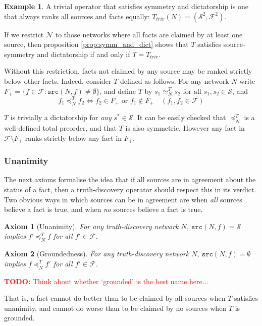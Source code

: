 \documentclass{article}
\theoremstyle{definition} \newtheorem{definition}{Definition}
\theoremstyle{definition} \newtheorem{example}{Example}
\theoremstyle{plain} \newtheorem{axiom}{Axiom}
\theoremstyle{plain} \newtheorem*{remark}{Remark}
\theoremstyle{remark} \newtheorem*{notation}{Notation}
\theoremstyle{plain} \newtheorem{lemma}{Lemma}
\theoremstyle{plain} \newtheorem{theorem}{Theorem}
\theoremstyle{plain} \newtheorem{proposition}{Proposition}
\newcommand{\todo}[1] {
    \textcolor{red}{
        \textbf{TODO:} #1
    }
}
\renewcommand{\S}{\mathcal{S}}  %
\newcommand{\F}{\mathcal{F}}
\newcommand{\N}{\mathcal{N}}
\newcommand{\seq}{\simeq}
\newcommand{\fle}{\preceq}
\newcommand{\src}{\texttt{src}}
\begin{document}
\begin{example}
A trivial operator that satisfies symmetry and dictatorship is one that always
ranks all sources and facts equally: $T_{triv}(N) = (\S^2, \F^2)$.

If we restrict $\N$ to those networks where all facts are claimed by
at least one source, then proposition \ref{prop:symm_and_dict} shows that $T$
satisfies source-symmetry and dictatorship if and only if $T=T_{triv}$.

Without this restriction, facts not claimed by any source may be ranked
strictly below other facts. Indeed, consider $T$ defined as follows. For any
network $N$ write $F_{+} = \{f \in \F : \src(N, f) \ne \emptyset \}$, and
define $T$ by $s_1 \seq_N^{T} s_2 \text{ for all } s_1, s_2 \in \S$, and
$$
    f_1 \fle_N^{T} f_2 \iff f_2 \in F_{+} \text{ or } f_1 \notin F_{+}
    \quad
    (f_1, f_2 \in \F)
$$

$T$ is trivially a dictatorship for \emph{any} $s^* \in \S$. It can be easily
checked that $\fle_N^T$ is a well-defined total preorder, and that $T$ is also
symmetric. However any fact in $\F \setminus F_+$ ranks strictly below any fact
in $F_+$.
\end{example}

\subsubsection{Unanimity}

The next axioms formalise the idea that if all sources are in agreement about
the status of a fact, then a truth-discovery operator should respect this in
its verdict. Two obvious ways in which sources can be in agreement are when
\emph{all} sources believe a fact is true, and when \emph{no} sources believe a
fact is true.

\begin{axiom}[Unanimity]
\label{axiom:unanimity}
For any truth-discovery network $N$, $\src(N, f) = \S$ implies $f' \fle_N^T f$
for all $f' \in \F$.
\end{axiom}

\begin{axiom}[Groundedness]
\label{axiom:groundedness}
For any truth-discovery network $N$, $\src(N, f) = \emptyset$ implies $f
\fle_N^T f'$ for all $f' \in \F$.
\end{axiom}

\todo{Think about whether `grounded' is the best name here...}

That is, a fact cannot do better than to be claimed by all sources when $T$
satisfies unanimity, and cannot do worse than to be claimed by no sources when
$T$ is grounded.
\end{document}
